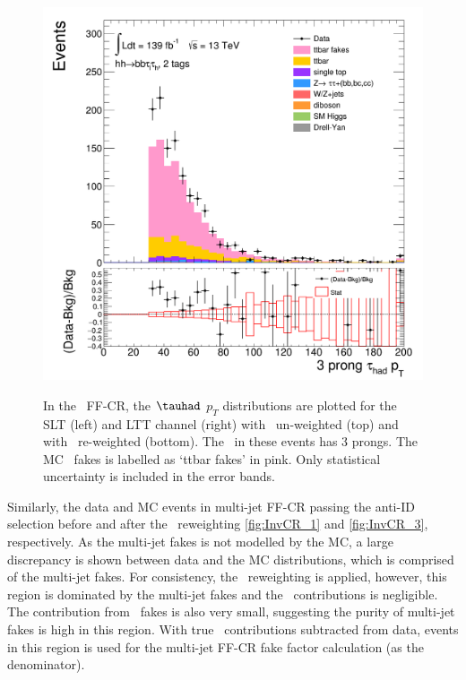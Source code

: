\begin{figure}[htbp]
\includegraphics[width=.48\textwidth]{DiHiggs/plots/FF_CRs/ttbarCR_LTT_weighted/HNone/BDTVarsHighMbb/2/C_2tag2pjet_0ptv_TauPt3P.png}\\
\caption{In the \ttbar\ FF-CR, the $\tauhad$ $p_T$ distributions are plotted 
for the SLT (left) and LTT channel (right) 
with \ttbar\ un-weighted (top) 
and with \ttbar\ re-weighted (bottom).
The \tauhad\ in these events has 3 prongs. 
The MC \ttbar\ fakes is labelled as `ttbar fakes' in pink.
Only statistical uncertainty is included in the error bands.
}
\label{fig:ttbarCR_3}
\end{figure} 


\newpage
Similarly, the data and MC events in multi-jet FF-CR passing the anti-ID selection 
before and after the \ttbar\ reweighting 
\ref{fig:InvCR_1} and \ref{fig:InvCR_3}, respectively.
As the multi-jet fakes is not modelled by the MC, a large discrepancy
is shown between data and the MC distributions, which is comprised
of the multi-jet fakes. 
For consistency, the \ttbar\ reweighting is applied, 
however, this region is dominated 
by the multi-jet fakes and the \ttbar\ contributions is negligible. 
The contribution from \ttbar\ fakes is also very small, suggesting 
the purity of multi-jet fakes is high in this region. 
With true \tauhad\ contributions subtracted from data, 
events in this region is used for the multi-jet FF-CR fake factor calculation
(as the denominator). 

